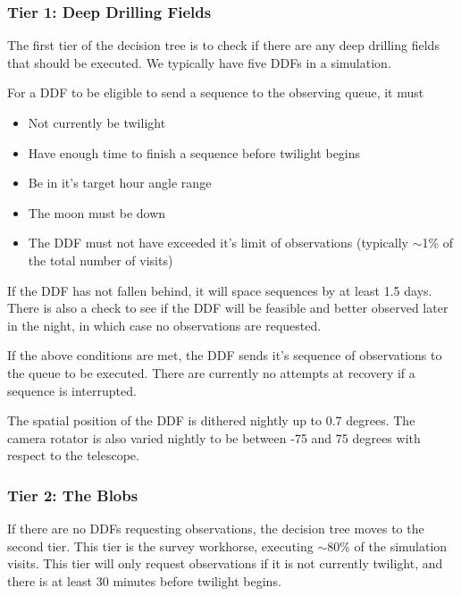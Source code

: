 \subsubsection{Tier 1:  Deep Drilling Fields}

The first tier of the decision tree is to check if there are any deep drilling fields that should be executed. We typically have five DDFs in a simulation. 

For a DDF to be eligible to send a sequence to the observing queue, it must
\begin{itemize}
\item{Not currently be twilight}
\item{Have enough time to finish a sequence before twilight begins}
\item{Be in it's target hour angle range}
\item{The moon must be down}
\item{The DDF must not have exceeded it's limit of observations (typically $\sim$1\% of the total number of visits)}
\end{itemize}

If the DDF has not fallen behind, it will space sequences by at least 1.5 days. There is also a check to see if the DDF will be feasible and better observed later in the night, in which case no observations are requested.

If the above conditions are met, the DDF sends it's sequence of observations to the queue to be executed. There are currently no attempts at recovery if a sequence is interrupted. 

The spatial position of the DDF is dithered nightly up to 0.7 degrees.  The camera rotator is also varied nightly to be between -75 and 75 degrees with respect to the telescope. 


\subsubsection{Tier 2:  The Blobs}

If there are no DDFs requesting observations, the decision tree moves to the second tier. This tier is the survey workhorse, executing $\sim$80\% of the simulation visits.  This tier will only request observations if it is not currently twilight, and there is at least 30 minutes before twilight begins.

